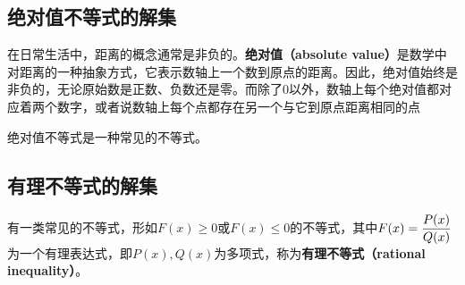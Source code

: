 \subsection{绝对值不等式的解集}

在日常生活中，距离的概念通常是非负的。\textbf{绝对值（absolute value）}是数学中对距离的一种抽象方式，它表示数轴上一个数到原点的距离。因此，绝对值始终是非负的，无论原始数是正数、负数还是零。而除了$0$以外，数轴上每个绝对值都对应着两个数字，或者说数轴上每个点都存在另一个与它到原点距离相同的点

绝对值不等式是一种常见的不等式。

\subsection{有理不等式的解集}

有一类常见的不等式，形如$F(x) \geq 0$或$F(x) \leq 0$的不等式，其中$\displaystyle F(x)={P(x)\over Q(x)}$为一个有理表达式，即$P(x),Q(x)$为多项式，称为\textbf{有理不等式（rational inequality）}。

